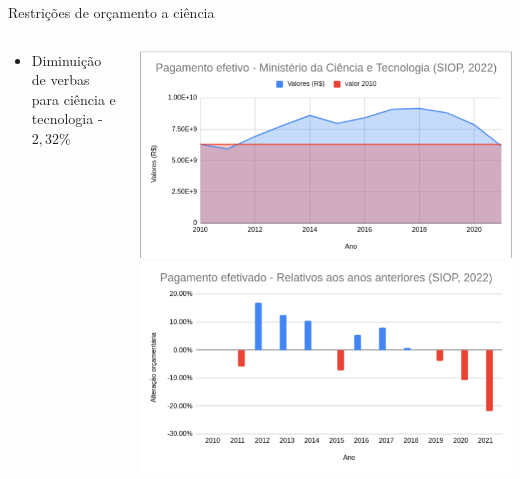 \documentclass[10pt,brazil]{beamer}
\theoremstyle{definition}
\begin{document}
\begin{frame}{Restrições de orçamento a ciência}
  \begin{columns}
    \begin{column}{0.5\textwidth}
              \begin{itemize}
                \item Diminuição de verbas para ciência e tecnologia -$2,32\%$
      \end{itemize}
    \end{column}
    \begin{column}{0.5\textwidth}  %
      \begin{center}
        \includegraphics[width=1\textwidth]{orcamento.png}
        \includegraphics[width=1\textwidth]{variacaoorcamentaria.png}
      \end{center}
    \end{column}
  \end{columns}
\end{frame}
\end{document}
